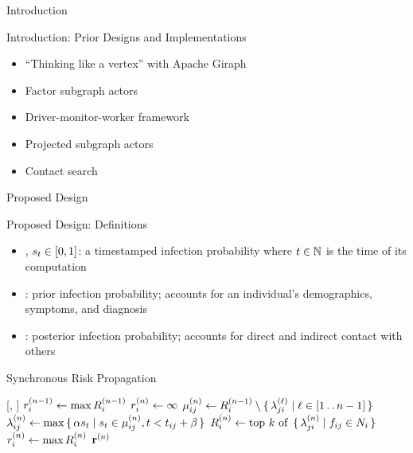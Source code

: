 \documentclass[11pt]{beamer}
\begin{document}
\begin{section}{Introduction}
\begin{frame}{Introduction: Prior Designs and Implementations}
\begin{itemize}
  \item  ``Thinking like a vertex'' with Apache Giraph
  \item Factor subgraph actors
  \item Driver-monitor-worker framework
  \item Projected subgraph actors \citep{Tatton2022b}
  \item Contact search
\end{itemize}
\end{frame}

\end{section}

\begin{section}{Proposed Design}

\begin{frame}{Proposed Design: Definitions}
\begin{itemize}
  \item {}, $s_t \in [0, 1]$: a timestamped infection probability where $t \in \mathbb{N}$ is the time of its computation
  \item {}: prior infection probability; accounts for an individual's demographics, symptoms, and diagnosis \citep{Briers2020, Menni2020}
  \item {}: posterior infection probability; accounts for direct and indirect contact with others
\end{itemize}
\end{frame}

\begin{frame}{Synchronous Risk Propagation}
\begin{function}{\nRiskPropagation}[\vScores, \vContacts]
  \pause
  \State $r_{i}^{(n - 1)} \leftarrow \max R_{i}^{(n - 1)}$
  \pause
  \State $r_{i}^{(n)} \leftarrow \infty$
  \pause
  \pause
    \State $\mu_{ij}^{(n)} \leftarrow R_{i}^{(n - 1)} \setminus \set{ \lambda_{ji}^{(\ell)} | \ell \in [1 \mathinner{\ldotp \ldotp} n - 1]}$
    \pause
    \State $\lambda_{ij}^{(n)} \leftarrow \max \set{ \alpha s_t| s_t\in \mu_{ij}^{(n)}, t< t_{ij} + \beta}$
    \pause
    \State $\vRiskScores{i}{n} \assign \topK{\setBuilder{\vFactorMessage{j}{i}{n}}{\vFactor[ij] \in \vNeighbors_i}}$
    \pause
    \State $r_{i}^{(n)} \leftarrow \max R_{i}^{(n)}$
    \pause
  \EndWhile
  \State \Return $\mathbf{r}^{(n)}$
\end{function}
\end{frame}


\end{section}
\end{document}

